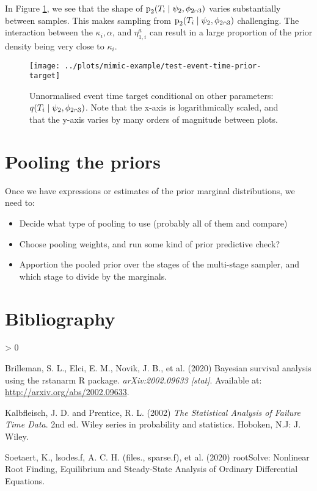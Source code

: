 \documentclass[
  10pt,
  a4paper,
]{article}
\providecommand{\tightlist}{%
  \setlength{\itemsep}{0pt}\setlength{\parskip}{0pt}}
\let\Oldcap\cap
\renewcommand{\cap}{\mathrel{\mathsmaller{\Oldcap}}}
\newcommand{\pd}{\text{p}}
\newlength{\cslhangindent}
\newenvironment{CSLReferences}[2] %
 {%
  \setlength{\parindent}{0pt}
  \ifodd #1 \everypar{\setlength{\hangindent}{\cslhangindent}}\ignorespaces\fi
  \ifnum #2 > 0
  \setlength{\parskip}{#2\baselineskip}
  \fi
 }%
 {}
\begin{document}
In Figure \ref{fig:prior_samples_plot}, we see that the shape of
\(\pd_{2}(T_{i} \mid \psi_{2}, \phi_{2 \cap 3})\) varies substantially
between samples. This makes sampling from
\(\pd_{2}(T_{i} \mid \psi_{2}, \phi_{2 \cap 3})\) challenging. The
interaction between the \(\kappa_{i}, \alpha\), and \(\eta_{1, i}^{a}\)
can result in a large proportion of the prior density being very close
to \(\kappa_{i}\).

\begin{figure}

{\centering \texttt{[image: ../plots/mimic-example/test-event-time-prior-target]} 

}

\caption{Unnormalised event time target conditional on other parameters: $q(T_{i} \mid \psi_{2}, \phi_{2 \cap 3})$. Note that the x-axis is logarithmically scaled, and that the y-axis varies by many orders of magnitude between plots.}\label{fig:prior_samples_plot}
\end{figure}

\hypertarget{pooling-the-priors}{%
\section{Pooling the priors}\label{pooling-the-priors}}

Once we have expressions or estimates of the prior marginal
distributions, we need to:

\begin{itemize}
\tightlist
\item
  Decide what type of pooling to use (probably all of them and compare)
\item
  Choose pooling weights, and run some kind of prior predictive check?
\item
  Apportion the pooled prior over the stages of the multi-stage sampler,
  and which stage to divide by the marginals.
\end{itemize}

\hypertarget{bibliography}{%
\section*{Bibliography}\label{bibliography}}

\hypertarget{refs}{}
\begin{CSLReferences}{1}{0}
\leavevmode\hypertarget{ref-brilleman_bayesian_2020}{}%
Brilleman, S. L., Elci, E. M., Novik, J. B., et al. (2020) Bayesian
survival analysis using the rstanarm {R} package. \emph{arXiv:2002.09633
{[}stat{]}}. Available at: \url{http://arxiv.org/abs/2002.09633}.

\leavevmode\hypertarget{ref-kalbfleisch_statistical_2002}{}%
Kalbfleisch, J. D. and Prentice, R. L. (2002) \emph{The Statistical
Analysis of Failure Time Data}. 2nd ed. Wiley series in probability and
statistics. {Hoboken, N.J}: {J. Wiley}.

\leavevmode\hypertarget{ref-soetaert_rootsolve_2020}{}%
Soetaert, K., lsodes.f, A. C. H. (files., sparse.f), et al. (2020)
{rootSolve}: {Nonlinear Root Finding}, {Equilibrium} and {Steady}-{State
Analysis} of {Ordinary Differential Equations}.

\end{CSLReferences}
\end{document}
